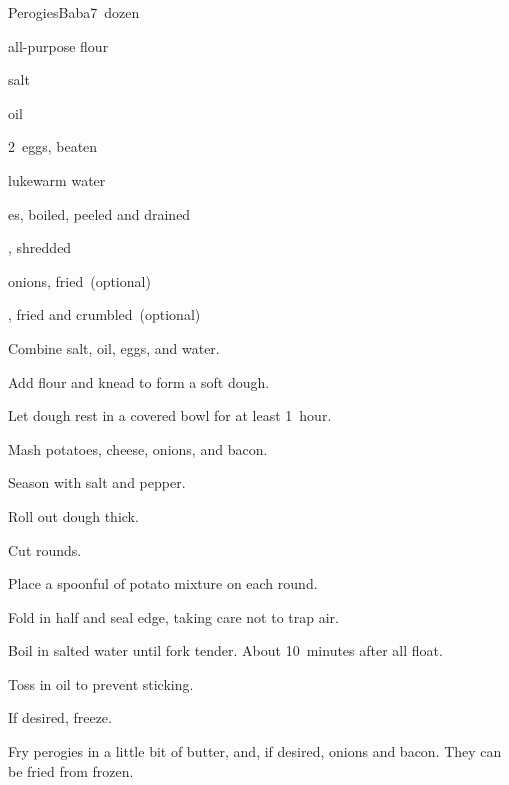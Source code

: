 \begin{recipe}{Perogies}{Baba}{7~dozen}

\begin{ingredients}
\item {} all-purpose flour
\item \tp{1\half} salt
\item {} oil
\item 2~eggs, beaten
\item \C{1\half} lukewarm water
\item \lbs{2\half} es, boiled, peeled and drained
\item \lbs{\half} , shredded
\item onions, fried~(optional)
\item {}, fried and crumbled~(optional)
\end{ingredients}

\begin{directions}
\item Combine salt, oil, eggs, and water.
\item Add flour and knead to form a soft dough.
\item Let dough rest in a covered bowl for at least 1~hour.
\item Mash potatoes, cheese, onions, and bacon.
\item Season with salt and pepper.
\item Roll out dough \inch{\eighth} thick.
\item Cut  rounds.
\item Place a spoonful of potato mixture on each round.
\item Fold in half and seal edge, taking care not to trap air.
\item Boil in salted water until fork tender. About 10~minutes after all float.
\item Toss in oil to prevent sticking.
\item If desired, freeze.
\item Fry perogies in a little bit of butter, and, if desired, onions and bacon. They can be fried from frozen.
\end{directions}


\end{recipe}
